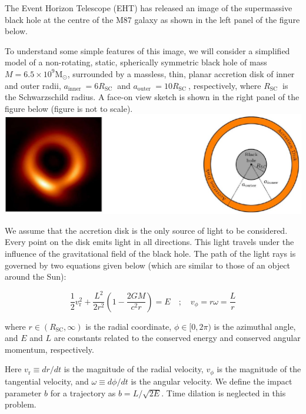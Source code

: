 \documentclass[10pt]{article}
\begin{document}
    The Event Horizon Telescope (EHT) has released an image of the supermassive black hole at the centre of the M87 galaxy as shown in the left panel of the figure below.

    To understand some simple features of this image, we will consider a simplified model of a non-rotating, static, spherically symmetric black hole of mass $M=6.5 \times 10^{9} \mathrm{M}_{\odot}$, surrounded by a massless, thin, planar accretion disk of inner and outer radii, $a_{\text {inner }}=6 R_{\text {SC }}$ and $a_{\text {outer }}=10 R_{\text {SC }}$, respectively, where $R_{\text {SC }}$ is the Schwarzschild radius. A face-on view sketch is shown in the right panel of the figure below (figure is not to scale).\\
    \includegraphics[max width=\textwidth, center]{2025_08_23_e94579452776a99c4850g-07}
    
    We assume that the accretion disk is the only source of light to be considered. Every point on the disk emits light in all directions. This light travels under the influence of the gravitational field of the black hole. The path of the light rays is governed by two equations given below (which are similar to those of an object around the Sun):
    
    $$
    \frac{1}{2} v_{\mathrm{r}}^{2}+\frac{L^{2}}{2 r^{2}}\left(1-\frac{2 G M}{c^{2} r}\right)=E \quad ; \quad v_{\phi}=r \omega=\frac{L}{r}
    $$
    
    where $r \in\left(R_{\mathrm{SC}}, \infty\right)$ is the radial coordinate, $\phi \in[0,2 \pi)$ is the azimuthal angle, and $E$ and $L$ are constants related to the conserved energy and conserved angular momentum, respectively.
    
    Here $v_{\mathrm{r}} \equiv d r / d t$ is the magnitude of the radial velocity, $v_{\phi}$ is the magnitude of the tangential velocity, and $\omega \equiv d \phi / d t$ is the angular velocity. We define the impact parameter $b$ for a trajectory as $b=L / \sqrt{2 E}$. Time dilation is neglected in this problem.
    
\end{document}
